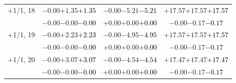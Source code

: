 \documentclass[compress]{beamer}
\begin{document}
\begin{frame}
\begin{tabular}{r | c | c | c}
$+$1/1, 18 & $-0.00$\hspace{0.1 cm}$+1.35$\hspace{0.1 cm}\textcolor{black}{$+1.35$} & $-0.00$\hspace{0.1 cm}$-5.21$\hspace{0.1 cm}\textcolor{black}{$-5.21$} & $+17.57$\hspace{0.1 cm}$+17.57$\hspace{0.1 cm}\textcolor{black}{$+17.57$} \\
           & $-0.00$\hspace{0.1 cm}$-0.00$\hspace{0.1 cm}\textcolor{black}{$-0.00$} & $+0.00$\hspace{0.1 cm}$+0.00$\hspace{0.1 cm}\textcolor{black}{$+0.00$} & $-0.00$\hspace{0.1 cm}$-0.17$\hspace{0.1 cm}\textcolor{black}{$-0.17$} \\
$+$1/1, 19 & $-0.00$\hspace{0.1 cm}$+2.23$\hspace{0.1 cm}\textcolor{black}{$+2.23$} & $-0.00$\hspace{0.1 cm}$-4.95$\hspace{0.1 cm}\textcolor{black}{$-4.95$} & $+17.57$\hspace{0.1 cm}$+17.57$\hspace{0.1 cm}\textcolor{black}{$+17.57$} \\
           & $-0.00$\hspace{0.1 cm}$-0.00$\hspace{0.1 cm}\textcolor{black}{$-0.00$} & $+0.00$\hspace{0.1 cm}$+0.00$\hspace{0.1 cm}\textcolor{black}{$+0.00$} & $-0.00$\hspace{0.1 cm}$-0.17$\hspace{0.1 cm}\textcolor{black}{$-0.17$} \\
$+$1/1, 20 & $-0.00$\hspace{0.1 cm}$+3.07$\hspace{0.1 cm}\textcolor{black}{$+3.07$} & $-0.00$\hspace{0.1 cm}$-4.54$\hspace{0.1 cm}\textcolor{black}{$-4.54$} & $+17.47$\hspace{0.1 cm}$+17.47$\hspace{0.1 cm}\textcolor{black}{$+17.47$} \\
           & $-0.00$\hspace{0.1 cm}$-0.00$\hspace{0.1 cm}\textcolor{black}{$-0.00$} & $+0.00$\hspace{0.1 cm}$+0.00$\hspace{0.1 cm}\textcolor{black}{$+0.00$} & $-0.00$\hspace{0.1 cm}$-0.17$\hspace{0.1 cm}\textcolor{black}{$-0.17$} \\

\end{tabular}
\end{frame}
\end{document}
